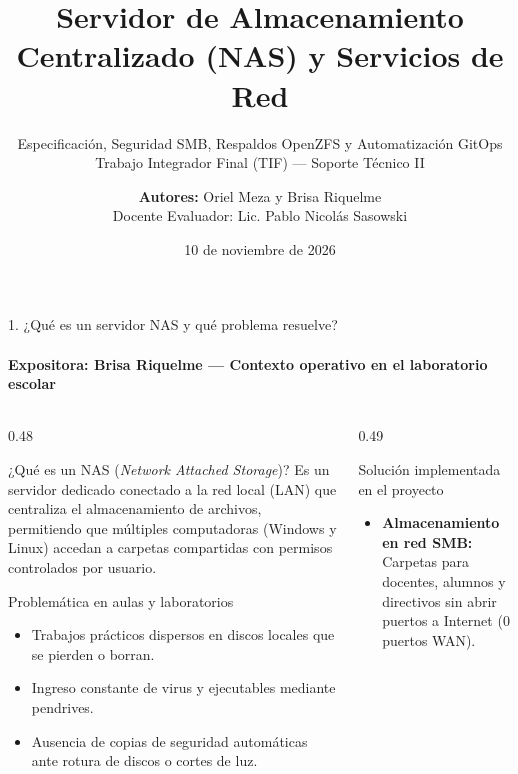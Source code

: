 \documentclass[aspectratio=169,10pt]{beamer}
\title[Infraestructura NAS — TIF]{Servidor de Almacenamiento Centralizado (NAS) y Servicios de Red}
\subtitle{Especificación, Seguridad SMB, Respaldos OpenZFS y Automatización GitOps\\Trabajo Integrador Final (TIF) — Soporte Técnico II}
\author[O. Meza y B. Riquelme]{\textbf{Autores:} Oriel Meza y Brisa Riquelme\\[0.15cm]\footnotesize Docente Evaluador: Lic. Pablo Nicolás Sasowski}
\institute[IESETyFP]{Instituto de Educación Superior de Educación Técnica y Formación Profesional (IESETyFP)}
\date{10 de noviembre de 2026}
\begin{document}
\begin{frame}
    \titlepage
\end{frame}

\begin{frame}{1. ¿Qué es un servidor NAS y qué problema resuelve?}
    \framesubtitle{Expositora: Brisa Riquelme — Contexto operativo en el laboratorio escolar}
    \begin{columns}[T]
        \begin{column}{0.48\textwidth}
            \begin{block}{¿Qué es un NAS (\textit{Network Attached Storage})?}
                Es un servidor dedicado conectado a la red local (LAN) que centraliza el almacenamiento de archivos, permitiendo que múltiples computadoras (Windows y Linux) accedan a carpetas compartidas con permisos controlados por usuario.
            \end{block}
            \vspace{0.15cm}
            \begin{alertblock}{Problemática en aulas y laboratorios}
                \begin{itemize}
                    \item Trabajos prácticos dispersos en discos locales que se pierden o borran.
                    \item Ingreso constante de virus y ejecutables mediante pendrives.
                    \item Ausencia de copias de seguridad automáticas ante rotura de discos o cortes de luz.
                \end{itemize}
            \end{alertblock}
        \end{column}
        \begin{column}{0.49\textwidth}
            \begin{exampleblock}{Solución implementada en el proyecto}
                \begin{itemize}
                    \item \textbf{Almacenamiento en red SMB:} Carpetas para docentes, alumnos y directivos sin abrir puertos a Internet (0 puertos WAN).

\end{itemize}
\end{exampleblock}
\end{column}
\end{columns}
\end{frame}
\end{document}
